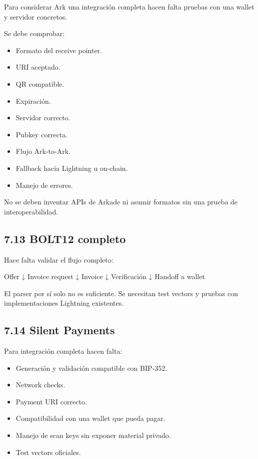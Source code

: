 \documentclass[
]{article}
\newenvironment{Shaded}{}{}
\newcommand{\NormalTok}[1]{#1}
\providecommand{\tightlist}{%
  \setlength{\itemsep}{0pt}\setlength{\parskip}{0pt}}
\begin{document}
Para considerar Ark una integración completa hacen falta pruebas con una
wallet y servidor concretos.

Se debe comprobar:

\begin{itemize}
\tightlist
\item
  Formato del receive pointer.
\item
  URI aceptado.
\item
  QR compatible.
\item
  Expiración.
\item
  Servidor correcto.
\item
  Pubkey correcta.
\item
  Flujo Ark-to-Ark.
\item
  Fallback hacia Lightning u on-chain.
\item
  Manejo de errores.
\end{itemize}

No se deben inventar APIs de Arkade ni asumir formatos sin una prueba de
interoperabilidad.

\hypertarget{bolt12-completo}{%
\subsection{7.13 BOLT12 completo}\label{bolt12-completo}}

Hace falta validar el flujo completo:

\begin{Shaded}
\begin{Highlighting}[]
\NormalTok{Offer}
\NormalTok{    ↓}
\NormalTok{Invoice request}
\NormalTok{    ↓}
\NormalTok{Invoice}
\NormalTok{    ↓}
\NormalTok{Verificación}
\NormalTok{    ↓}
\NormalTok{Handoff a wallet}
\end{Highlighting}
\end{Shaded}

El parser por sí solo no es suficiente. Se necesitan test vectors y
pruebas con implementaciones Lightning existentes.

\hypertarget{silent-payments}{%
\subsection{7.14 Silent Payments}\label{silent-payments}}

Para integración completa hacen falta:

\begin{itemize}
\tightlist
\item
  Generación y validación compatible con BIP-352.
\item
  Network checks.
\item
  Payment URI correcto.
\item
  Compatibilidad con una wallet que pueda pagar.
\item
  Manejo de scan keys sin exponer material privado.
\item
  Test vectors oficiales.
\end{itemize}
\end{document}
